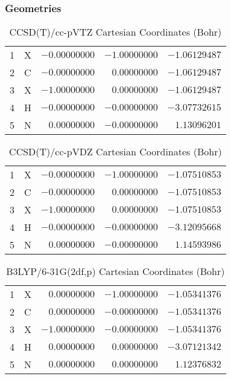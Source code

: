 \documentclass[10pt,oneside]{article}
\begin{document}
\clearpage

\subsection{\ \ \ }

\subsubsection*{Geometries}
\begin{table}[h!]
\centering
\caption{CCSD(T)/cc-pVTZ Cartesian Coordinates (Bohr)}
\begin{tabular}{llrrr}
1  & X  & $-0.00000000$ & $-1.00000000$ & $-1.06129487$ \\
2  & C  & $-0.00000000$ & $ 0.00000000$ & $-1.06129487$ \\
3  & X  & $-1.00000000$ & $ 0.00000000$ & $-1.06129487$ \\
4  & H  & $-0.00000000$ & $-0.00000000$ & $-3.07732615$ \\
5  & N  & $ 0.00000000$ & $-0.00000000$ & $ 1.13096201$ \\
\end{tabular}
\end{table}

\begin{table}[h!]
\centering
\caption{CCSD(T)/cc-pVDZ Cartesian Coordinates (Bohr)}
\begin{tabular}{llrrr}
1  & X  & $-0.00000000$ & $-1.00000000$ & $-1.07510853$ \\
2  & C  & $-0.00000000$ & $ 0.00000000$ & $-1.07510853$ \\
3  & X  & $-1.00000000$ & $ 0.00000000$ & $-1.07510853$ \\
4  & H  & $-0.00000000$ & $-0.00000000$ & $-3.12095668$ \\
5  & N  & $ 0.00000000$ & $-0.00000000$ & $ 1.14593986$ \\
\end{tabular}
\end{table}

\begin{table}[h!]
\centering
\caption{B3LYP/6-31G(2df,p) Cartesian Coordinates (Bohr)}
\begin{tabular}{llrrr}
1  & X  & $ 0.00000000$ & $-1.00000000$ & $-1.05341376$ \\
2  & C  & $ 0.00000000$ & $-0.00000000$ & $-1.05341376$ \\
3  & X  & $-1.00000000$ & $-0.00000000$ & $-1.05341376$ \\
4  & H  & $ 0.00000000$ & $ 0.00000000$ & $-3.07121342$ \\
5  & N  & $ 0.00000000$ & $ 0.00000000$ & $ 1.12376832$ \\
\end{tabular}
\end{table}
\end{document}
